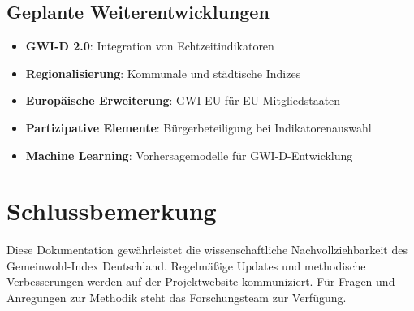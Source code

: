 \subsection{Geplante Weiterentwicklungen}

\begin{itemize}
    \item \textbf{GWI-D 2.0}: Integration von Echtzeitindikatoren
    \item \textbf{Regionalisierung}: Kommunale und städtische Indizes
    \item \textbf{Europäische Erweiterung}: GWI-EU für EU-Mitgliedstaaten
    \item \textbf{Partizipative Elemente}: Bürgerbeteiligung bei Indikatorenauswahl
    \item \textbf{Machine Learning}: Vorhersagemodelle für GWI-D-Entwicklung
\end{itemize}

\section*{Schlussbemerkung}

Diese Dokumentation gewährleistet die wissenschaftliche Nachvollziehbarkeit des Gemeinwohl-Index Deutschland. Regelmäßige Updates und methodische Verbesserungen werden auf der Projektwebsite kommuniziert. Für Fragen und Anregungen zur Methodik steht das Forschungsteam zur Verfügung.

\endinput